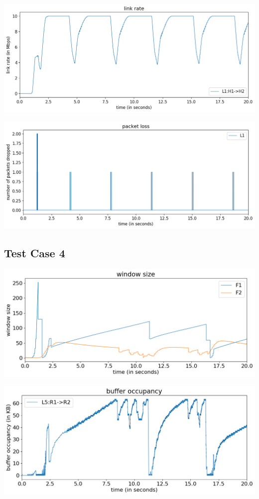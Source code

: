 \documentclass{article}
\begin{document}
\includegraphics[width = \textwidth]{"test_case3 link rate"}

\includegraphics[width = \textwidth]{"test_case3 packet loss"}





\subsection{Test Case 4}

\includegraphics[width = \textwidth]{"test_case4 window size"}

\includegraphics[width = \textwidth]{"test_case4 buffer occupancy"}
\end{document}
